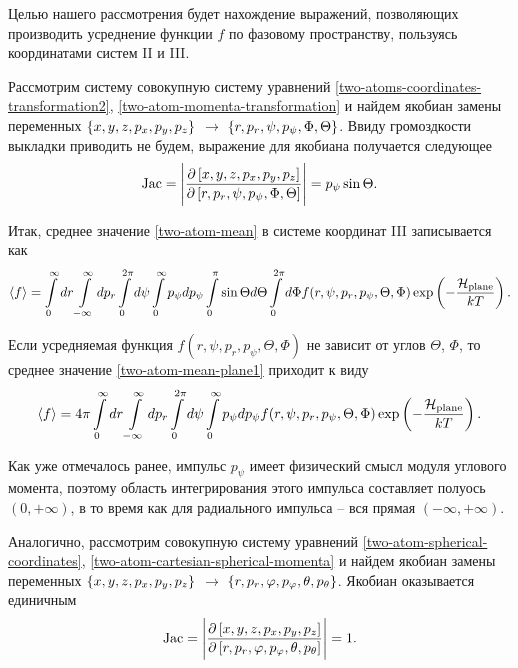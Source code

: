 Целью нашего рассмотрения будет нахождение выражений, позволяющих производить усреднение функции $f$ по фазовому пространству, пользуясь координатами систем II и III. \par
Рассмотрим систему совокупную систему уравнений \eqref{two-atoms-coordinates-transformation2}, \eqref{two-atom-momenta-transformation} и найдем якобиан замены переменных $\left\{ x, y, z, p_x, p_y, p_z \right\}$ $\rightarrow$ $\left\{ r, p_r, \psi, p_\psi, \Phi, \Theta \right\}$. Ввиду громоздкости выкладки приводить не будем, выражение для якобиана получается следующее
\begin{gather}
    \text{Jac} = \Bigg\vert \frac{\partial \left[ x, y, z, p_x, p_y, p_z \right]}{\partial \left[ r, p_r, \psi, p_\psi, \Phi, \Theta \right]} \Bigg\vert = p_\psi \sin \Theta. \label{two-atom-planar-jacobian}
\end{gather}

Итак, среднее значение \eqref{two-atom-mean} в системе координат III записывается как
\begin{gather}
    \langle  f  \rangle = \int\limits_{0}^{\infty} dr \int\limits_{-\infty}^\infty dp_r \int\limits_0^{2\pi} d\psi \int\limits_0^\infty p_\psi dp_\psi \int\limits_0^\pi \sin \Theta d\Theta \int\limits_0^{2\pi} d\Phi f(r, \psi, p_r, p_\psi, \Theta, \Phi) \exp \left( -\frac{\mathcal{H}_\text{plane}}{k T} \right). \label{two-atom-mean-plane1} 
\end{gather}

Если усредняемая функция $f(r, \psi, p_r, p_\psi, \Theta, \Phi)$ не зависит от углов $\Theta$, $\Phi$, то среднее значение  \eqref{two-atom-mean-plane1} приходит к виду
\begin{gather}
    \langle  f  \rangle = 4 \pi \int\limits_{0}^{\infty} dr \int\limits_{-\infty}^\infty dp_r \int\limits_0^{2\pi} d\psi \int\limits_0^\infty p_\psi dp_\psi f(r, \psi, p_r, p_\psi, \Theta, \Phi) \exp \left( -\frac{\mathcal{H}_\text{plane}}{k T} \right). \label{two-atom-mean-plane2} 
\end{gather}

Как уже отмечалось ранее, импульс $p_\psi$ имеет физический смысл модуля углового момента, поэтому область интегрирования этого импульса составляет полуось $(0, +\infty)$, в то время как для радиального импульса -- вся прямая $(-\infty, +\infty)$. \par
Аналогично, рассмотрим совокупную систему уравнений \eqref{two-atom-spherical-coordinates}, \eqref{two-atom-cartesian-spherical-momenta} и найдем якобиан замены переменных $\left\{ x, y, z, p_x, p_y, p_z \right\}$ $\rightarrow$ $\left\{ r, p_r, \varphi, p_\varphi, \theta, p_\theta \right\}$. Якобиан оказывается единичным 
\begin{gather}
    \text{Jac} = \Bigg\vert \frac{\partial \left[ x, y, z, p_x, p_y, p_z \right]}{\partial \left[ r, p_r, \varphi, p_\varphi, \theta, p_\theta \right]} \Bigg\vert = 1. 
\end{gather}

